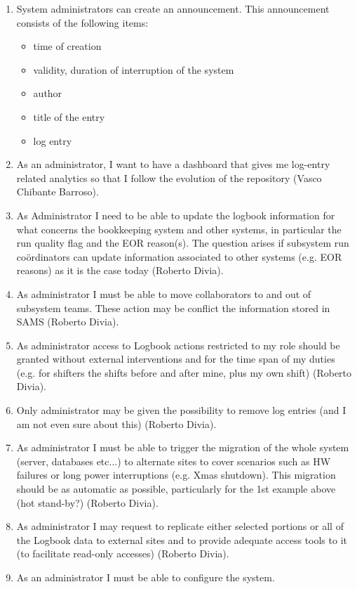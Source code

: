 \begin{enumerate}
  \item System administrators can create an announcement. This announcement consists of the following items:
  \begin{itemize}
    \item time of creation
    \item validity, duration of interruption of the system
    \item author
    \item title of the entry
    \item log entry
  \end{itemize}
  \item As an administrator, I want to have a dashboard that gives me log-entry related analytics so that I follow the evolution of the repository (Vasco Chibante Barroso). 
  \item As Administrator I need to be able to update the logbook information for what concerns the bookkeeping system and other systems, in particular the run quality flag and the EOR reason(s). The question arises if subsystem run co\"ordinators can update information associated to other systems (e.g. EOR reasons) as it is the case today (Roberto Divia).
  \item As administrator I must be able to move collaborators to and out of subsystem teams. These action may be conflict the information stored in SAMS (Roberto Divia).
    \item As administrator access to Logbook actions restricted to my role should be granted without external interventions and for the time span of my duties (e.g. for shifters the shifts before and after mine, plus my own shift) (Roberto Divia).
  \item Only administrator may be given the possibility to remove log entries (and I am not even sure about this) (Roberto Divia).
\item As administrator I must be able to trigger the migration of the whole system (server, databases etc...) to alternate sites to cover scenarios such as HW failures or long power interruptions (e.g. Xmas shutdown). This migration should be as automatic as possible, particularly for the 1st example above (hot stand-by?) (Roberto Divia).
  \item As administrator I may request to replicate either selected portions or all of the Logbook data to external sites and to provide adequate access tools to it (to facilitate read-only accesses) (Roberto Divia).
  \item As an administrator I must be able to configure the system.
\end{enumerate}

